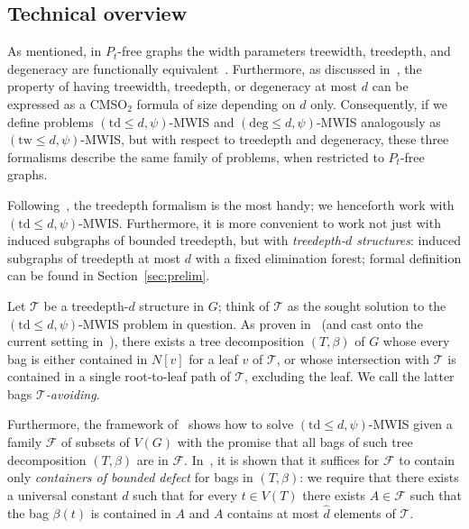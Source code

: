\documentclass[11pt,a4paper]{article}
\theoremstyle{definition}
\def\T{\mathcal{T}}
\newcommand{\CMSO}{\textsf{CMSO}$_2$\xspace}
\begin{document}
\subsection{Technical overview}

As mentioned, in $P_t$-free graphs the width parameters treewidth, treedepth, and degeneracy are functionally equivalent~\cite{DBLP:journals/jctb/BonamyBPRTW22}.
Furthermore, as discussed in~\cite{DBLP:conf/soda/ChudnovskyMPPR24}, the property of having treewidth, treedepth, or degeneracy at most $d$ can be expressed as a \CMSO formula of size
depending on $d$ only. Consequently, if we define problems $(\mathrm{td} \leq d,\psi)$-\textsc{MWIS} and $(\mathrm{deg} \leq d,\psi)$-\textsc{MWIS} analogously
as $(\mathrm{tw} \leq d,\psi)$-\textsc{MWIS}, but with respect to treedepth and degeneracy, these three formalisms describe the same family of problems, when restricted to $P_t$-free graphs. 

Following~\cite{DBLP:conf/soda/ChudnovskyMPPR24}, the treedepth formalism is the most handy; we henceforth work with $(\mathrm{td} \leq d, \psi)$-\textsc{MWIS}. 
Furthermore, it is more convenient to work not just with induced subgraphs of bounded treedepth, but with \emph{treedepth-$d$ structures}:
induced subgraphs of treedepth at most $d$ with a fixed elimination forest; formal definition can be found in Section~\ref{sec:prelim}. 

Let $\T$ be a treedepth-$d$ structure in $G$; think of $\T$ as the sought solution to the $(\mathrm{td} \leq d, \psi)$-\textsc{MWIS} problem in question. 
As proven in~\cite{FominTV15} (and cast onto the current setting in~\cite{DBLP:conf/soda/ChudnovskyMPPR24}), there exists a tree decomposition $(T,\beta)$ of $G$
whose every bag is either contained in $N[v]$ for a leaf $v$ of $\T$, or whose intersection with $\T$ is contained in a single root-to-leaf path of $\T$, excluding the leaf.
We call the latter bags \emph{$\T$-avoiding}. 

Furthermore, the framework of~\cite{FominTV15} shows how to solve $(\mathrm{td} \leq d,\psi)$-\textsc{MWIS} given a family $\mathcal{F}$ of subsets of $V(G)$
with the promise that all bags of such tree decomposition $(T,\beta)$ are in $\mathcal{F}$. 
In~\cite{Tara}, it is shown that it suffices for $\mathcal{F}$ to contain only \emph{containers of bounded defect} for bags in $(T,\beta)$: 
we require that there exists a universal constant $\widehat{d}$ such that for every $t \in V(T)$ there exists $A \in \mathcal{F}$ such that
the bag $\beta(t)$ is contained in $A$ and $A$ contains at most $\widehat{d}$ elements of $\T$. 
\end{document}
